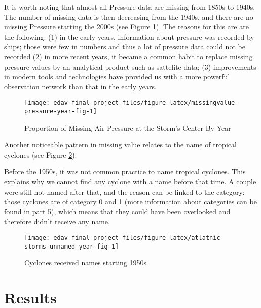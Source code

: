 \documentclass[]{book}
\begin{document}
It is worth noting that almost all Pressure data are missing from 1850s to 1940s. The number of missing data is then decreasing from the 1940s, and there are no missing Pressure starting the 2000s (see Figure \ref{fig:missingvalue-pressure-year-fig}). The reasons for this are are the following: (1) in the early years, information about pressure was recorded by ships; those were few in numbers and thus a lot of pressure data could not be recorded (2) in more recent years, it became a common habit to replace missing pressure values by an analytical product such as sattelite data; (3) improvements in modern tools and technologies have provided us with a more powerful observation network than that in the early years.

\begin{figure}

{\centering \texttt{[image: edav-final-project\_files/figure-latex/missingvalue-pressure-year-fig-1]} 

}

\caption{Proportion of Missing Air Pressure at the Storm's Center By Year}\label{fig:missingvalue-pressure-year-fig}
\end{figure}

Another noticeable pattern in missing value relates to the name of tropical cyclones (see Figure \ref{fig:atlatnic-storms-unnamed-year-fig}).

Before the 1950s, it was not common practice to name tropical cyclones. This explains why we cannot find any cyclone with a name before that time. A couple were still not named after that, and the reason can be linked to the category: those cyclones are of category 0 and 1 (more information about categories can be found in part 5), which means that they could have been overlooked and therefore didn't receive any name.

\begin{figure}

{\centering \texttt{[image: edav-final-project\_files/figure-latex/atlatnic-storms-unnamed-year-fig-1]} 

}

\caption{Cyclones received names starting 1950s}\label{fig:atlatnic-storms-unnamed-year-fig}
\end{figure}

\hypertarget{result}{%
\chapter{Results}\label{result}}
\end{document}
